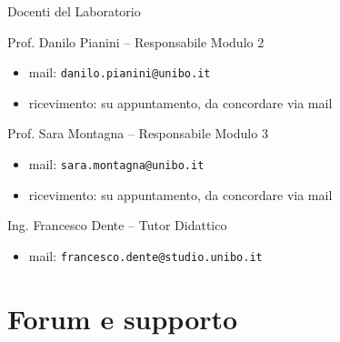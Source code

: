 \documentclass[xcolor=dvipsnames,presentation]{beamer}
\begin{document}
\begin{frame}{Docenti del Laboratorio}
    \begin{block}{Prof. Danilo Pianini -- Responsabile Modulo 2}
        \begin{itemize}
            \item mail: \texttt{danilo.pianini@unibo.it}
            \item ricevimento: su appuntamento, da concordare via mail
        \end{itemize}
    \end{block}
    \begin{block}{Prof. Sara Montagna -- Responsabile Modulo 3}
        \begin{itemize}
            \item mail: \texttt{sara.montagna@unibo.it}
            \item ricevimento: su appuntamento, da concordare via mail
        \end{itemize}
    \end{block}
    \begin{block}{Ing. Francesco Dente -- Tutor Didattico}
        \begin{itemize}
            \item mail: \texttt{francesco.dente@studio.unibo.it}
        \end{itemize}
    \end{block}
\end{frame}

\section{Forum e supporto}
\end{document}
